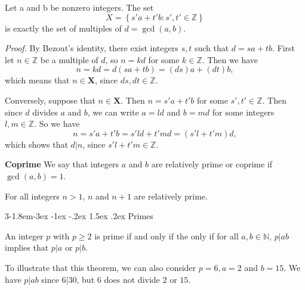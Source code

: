 \documentclass{tufte-handout}
\makeatletter
\renewcommand{\subsection}{\@startsection{subsection}%
    {3}{-1.8em}{-3ex \@plus -1ex \@minus -.2ex}%
    {1.5ex \@plus .2ex}
    {\hspace*{-5.5em}\fcolorbox{ltblue}{ltblue}{\parbox[c][1.0ex][b]{4em}{\phantom{space}}}
    \normalfont\large\itshape\color{ltblue}}}
\makeatother
\begin{document}


\begin{Proposition}
    Let a and b be nonzero integers. The set
    \[X = \left\{s'a+t'b:s',t'\in \mathbb{Z}\right\}\]
    is exactly the set of multiples of $ d = \gcd(a,b) $.
\end{Proposition}
\textit{Proof.} By Bezout's identity, there exist integers $ s,t $ such that \( d = sa+tb \).
First let \( n \in \mathbb{Z} \) be a multiple of \( d \), so \( n = kd \) for some \( k \in \mathbb{Z} \).
Then we have \[n=kd=d(sa+tb)=(ds)a+(dt)b,\]
which means that \( n\in \mathbf{X} \), since \( ds,dt \in \mathbb{Z} \).

Conversely, suppose that \( n \in \mathbf{X} \). Then \( n = s'a+t'b \) for some \( s',t' \in \mathbb{Z} \).
Then since \( d \) divides \( a \) and \( b \), we can write \( a=ld \) and \( b=md \) for some integers \( l,m \in \mathbb{Z}\).
So we have \[n=s'a+t'b=s'ld+t'md=(s'l+t'm)d,\]
which shows that \( d|n \), since \( s'l+t'm \in \mathbb{Z} \). \qedsymbol

\textbf{Coprime} We say that integers \( a \) and \( b \) are relatively prime or coprime if \( \gcd(a,b) = 1 \).

\begin{Proposition}
    For all integers \( n>1 \), \( n \) and \( n+1 \) are relatively prime.
\end{Proposition}

\subsection{Primes}
\begin{Theorem}
    An integer \( p \) with \( p\geq 2 \) is prime if and only if the only if for
    all \( a,b \in \mathbb{N} \), \( p|ab \) implies that \( p|a \) or \( p|b \).
\end{Theorem}


To illustrate that this theorem, we can also consider \( p=6,a=2 \) and \( b=15 \).
We have \( p|ab \) since \( 6|30 \), but \( 6 \) does not divide \( 2 \) or \( 15 \).\\
\end{document}
